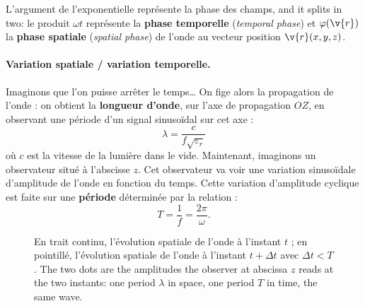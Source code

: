 L'argument de l'exponentielle représente la phase des champs, and it splits in
two: le produit $\omega t$ représente la \textbf{phase temporelle}
(\textit{temporal phase}) et $\varphi(\v{r})$ la \textbf{phase spatiale}
(\textit{spatial phase}) de l'onde au vecteur position $\v{r}(x,y,z)$.

\paragraph{Variation spatiale / variation temporelle.}
Imaginons que l'on puisse arrêter le temps… On fige alors la propagation de
l'onde : on obtient la \textbf{longueur d'onde}, sur l'axe de propagation $OZ$,
en observant une période d'un signal sinusoïdal sur cet axe :
\[
  \boxed{\ \lambda = \frac{c}{f\sqrt{\varepsilon_r}}\ }
\]
où $c$ est la vitesse de la lumière dans le vide. Maintenant, imaginons un
observateur situé à l'abscisse $z$. Cet observateur va voir une variation
sinusoïdale d'amplitude de l'onde en fonction du temps. Cette variation
d'amplitude cyclique est faite sur une \textbf{période} déterminée par la
relation :
\[
  T = \frac{1}{f} = \frac{2\pi}{\omega}.
\]

\begin{figure}[h!]
  \centering
  \caption*{\small En trait continu, l'évolution spatiale de l'onde à l'instant
  $t$ ; en pointillé, l'évolution spatiale de l'onde à l'instant
  $t + \Delta t$ avec $\Delta t < T$. The two dots are the amplitudes the
  observer at abscissa $z$ reads at the two instants: one period $\lambda$ in
  space, one period $T$ in time, the same wave.}
\end{figure}

